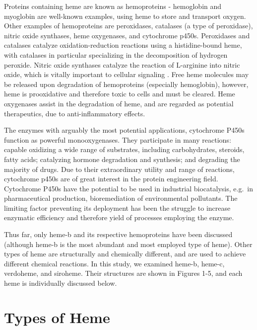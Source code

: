\documentclass[a4paper, nobind]{templates/ociamthesis}
\begin{document}
Proteins containing heme are known as hemoproteins - hemoglobin and myoglobin are well-known examples, using heme to store and transport oxygen. Other examples of hemoproteins are peroxidases, catalases (a type of peroxidase), nitric oxide synthases, heme oxygenases, and cytochrome p450s. Peroxidases and catalases catalyze oxidation-reduction reactions using a histidine-bound heme, with catalases in particular specializing in the decomposition of hydrogen peroxide. Nitric oxide synthases catalyze the reaction of L-arginine into nitric oxide, which is vitally important to cellular signaling \autocite{Poulos2014}. Free heme molecules may be released upon degradation of hemoproteins (especially hemoglobin), however, heme is prooxidative and therefore toxic to cells and must be cleared. Heme oxygenases assist in the degradation of heme, and are regarded as potential therapeutics, due to anti-inflammatory effects\autocite{Araujo2012}.

The enzymes with arguably the most potential applications, cytochrome P450s function as powerful monooxygenases. They participate in many reactions: capable oxidizing a wide range of substrates, including carbohydrates, steroids, fatty acids; catalyzing hormone degradation and synthesis; and degrading the majority of drugs\autocite{Poulos2014}. Due to their extraordinary utility and range of reactions, cytochrome p450s are of great interest in the protein engineering field. Cytochrome P450s have the potential to be used in industrial biocatalysis, e.g.~in pharmaceutical production, bioremediation of environmental pollutants\autocite{Du2017,Lalonde2016}. The limiting factor preventing its deployment has been the struggle to increase enzymatic efficiency and therefore yield of processes employing the enzyme\autocite{Girvan2016,Li2020}.

Thus far, only heme-b and its respective hemoproteins have been discussed (although heme-b is the most abundant and most employed type of heme). Other types of heme are structurally and chemically different, and are used to achieve different chemical reactions. In this study, we examined heme-b, heme-c, verdoheme, and siroheme. Their structures are shown in Figures 1-5, and each heme is individually discussed below.

\hypertarget{types-of-heme}{%
\section{Types of Heme}\label{types-of-heme}}
\end{document}
